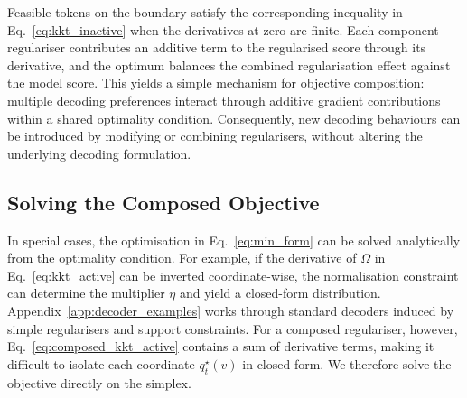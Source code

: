 \documentclass{article} %
\begin{document}
Feasible tokens on the boundary satisfy the corresponding inequality in Eq.~\ref{eq:kkt_inactive} when the derivatives at zero are finite. Each component regulariser contributes an additive term to the regularised score through its derivative, and the optimum balances the combined regularisation effect against the model score. This yields a simple mechanism for objective composition: multiple decoding preferences interact through additive gradient contributions within a shared optimality condition. Consequently, new decoding behaviours can be introduced by modifying or combining regularisers, without altering the underlying decoding formulation.

\subsection{Solving the Composed Objective}
\label{subsec:solving_composed_objective}
In special cases, the optimisation in Eq.~\ref{eq:min_form} can be solved analytically from the optimality condition. For example, if the derivative of $\Omega$ in Eq.~\ref{eq:kkt_active} can be inverted coordinate-wise, the normalisation constraint can determine the multiplier $\eta$ and yield a closed-form distribution. Appendix~\ref{app:decoder_examples} works through standard decoders induced by simple regularisers and support constraints. For a composed regulariser, however, Eq.~\ref{eq:composed_kkt_active} contains a sum of derivative terms, making it difficult to isolate each coordinate $q_t^\star(v)$ in closed form. We therefore solve the objective directly on the simplex.
\end{document}
